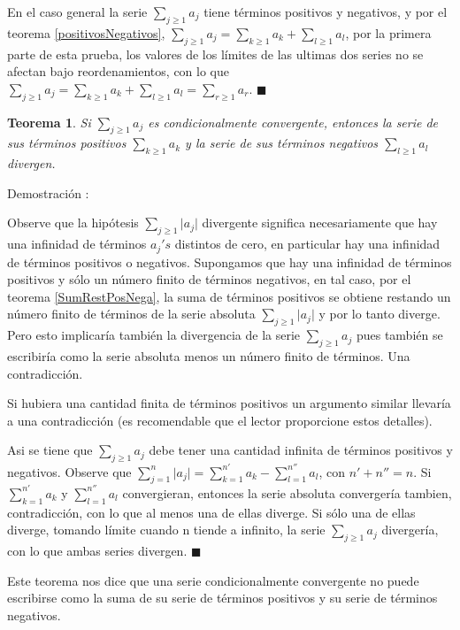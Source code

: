 \documentclass[12pt]{book}
\providecommand{\abs}[1]{\lvert#1\rvert}
\newtheorem{teo}{Teorema}[section]
\begin{document}
En el caso general la serie $\sum_{j \ge 1}a_j$ tiene términos positivos y negativos, y por el teorema \ref{positivosNegativos}, $\sum_{j \ge 1}a_j=\sum_{k \ge 1}a_k+\sum_{l \ge 1}a_l$, por la primera parte de esta prueba, los valores de los límites de las ultimas dos series no se afectan bajo reordenamientos, con lo que $\sum_{j \ge 1}a_j=\sum_{k \ge 1}a_k+\sum_{l \ge 1}a_l=\sum_{r \ge 1}a_r$. $\blacksquare$
\begin{teo}\rm
Si $\sum_{j \ge 1}a_j$ es condicionalmente convergente, entonces la serie de sus términos positivos $\sum_{k \ge 1}a_k$ y la serie de sus términos negativos $\sum_{l \ge 1}a_l$ divergen.
\end{teo}
Demostración :

Observe que la hipótesis $\sum_{j \ge 1}\abs{a_j}$ divergente significa necesariamente que hay una infinidad de términos $a_j's$ distintos de cero, en particular hay una infinidad de términos positivos o negativos. Supongamos que hay una infinidad de términos positivos y sólo un número finito de términos negativos, en tal caso, por el teorema \ref{SumRestPosNega}, la suma de términos positivos se obtiene restando un número finito de términos de la serie absoluta $\sum_{j \ge 1}\abs{a_j}$ y por lo tanto diverge. Pero esto implicaría también la divergencia de la serie $\sum_{j \ge 1}a_j$ pues también se escribiría como la serie absoluta menos un número finito de términos. Una contradicción.

Si hubiera una cantidad finita de términos positivos un argumento similar llevaría a una contradicción (es recomendable que el lector proporcione estos detalles).

Asi se tiene que $\sum_{j \ge 1}a_j$ debe tener una cantidad infinita de términos positivos y negativos. Observe que $\sum_{j=1}^n\abs{a_j}=\sum_{k=1}^{n'}a_k-\sum_{l=1}^{n''}a_l$, con $n'+n''=n$. Si $\sum_{k=1}^{n'}a_k$ y $\sum_{l=1}^{n''}a_l$ convergieran, entonces la serie absoluta convergería tambien, contradicción, con lo que al menos una de ellas diverge. Si sólo una de ellas diverge, tomando límite cuando n tiende a infinito, la serie $\sum_{j \ge 1}a_j$ divergería, con lo que ambas series divergen. $\blacksquare$

Este teorema nos dice que una serie condicionalmente convergente no puede escribirse como la suma de su serie de términos positivos y su serie de términos negativos.
\end{document}
